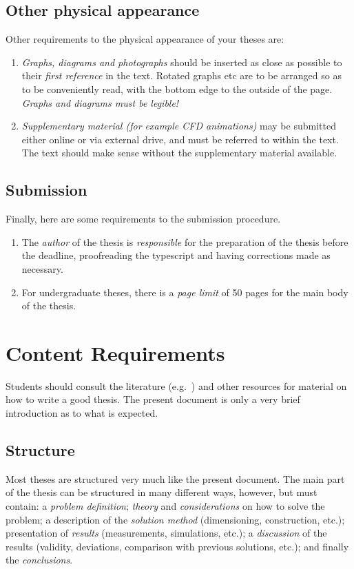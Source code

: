 \section{Other physical appearance}
Other requirements to the physical appearance of your theses are:
\begin{enumerate}
\item \emph{Graphs, diagrams and photographs} should be inserted as close as
possible to their \emph{first reference} in the text. Rotated
graphs etc are to be arranged so as to be conveniently read, with the
bottom edge to the outside of the page.
\emph{Graphs and diagrams must be legible!}
\item \emph{Supplementary material (for example CFD animations)} may be submitted either online or via external drive, and must be referred to within the text. The text should make sense without the supplementary material available. 
\end{enumerate}

\section{Submission}

Finally, here are some requirements to the submission procedure. 

\begin{enumerate}
\item The \emph{author} of the thesis is \emph{responsible} for the preparation of the
thesis before the deadline, proofreading the
typescript and having corrections made as necessary.
\item For undergraduate theses, there is a \emph{page limit} of 50 pages for the main body of the thesis.
\end{enumerate}



\chapter{Content Requirements}\label{ch:content}

Students should consult the literature (e.g.~\cite{Sid99,StrWhi79,Coo64,GRS14})
and other resources for material on how to write a good
thesis.  The present document is only a very brief introduction as to what
is expected.

\nocite{NieLeh03,HasLehKwo05}

\section{Structure}
Most theses are structured very much like the present document.
The main part of the thesis can be structured in many different ways,
however, but must contain: a \emph{problem definition};
\emph{theory} and \emph{considerations} on how to solve the problem;
a description of the \emph{solution method} (dimensioning, construction,
etc.);
presentation of \emph{results} (measurements, simulations, etc.);
a \emph{discussion} of the results (validity, deviations, comparison
with previous solutions, etc.); and finally the \emph{conclusions}.

